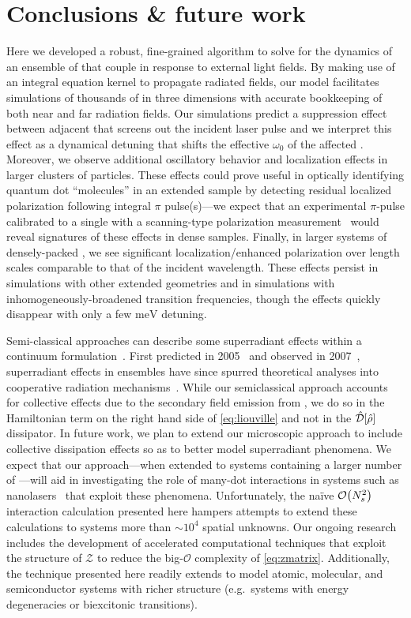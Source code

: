 \section{\label{section:conclusion}Conclusions \& future work}
Here we developed a robust, fine-grained algorithm to solve for the dynamics of an ensemble of \qds{} that couple in response to external light fields.
By making use of an integral equation kernel to propagate radiated fields, our model facilitates simulations of thousands of \qds{} in three dimensions with accurate bookkeeping of both near and far radiation fields.
Our simulations predict a suppression effect between adjacent \qds{} that screens out the incident laser pulse and we interpret this effect as a dynamical detuning that shifts the effective $\omega_0$ of the affected \qds{}.
Moreover, we observe additional oscillatory behavior and localization effects in larger clusters of particles.
These effects could prove useful in optically identifying quantum dot ``molecules'' in an extended sample by detecting residual localized polarization following integral $\pi$ pulse(s)---we expect that an experimental $\pi$-pulse calibrated to a single \qd{} with a scanning-type polarization measurement~\cite{Asakura2013} would reveal signatures of these effects in dense samples.
Finally, in larger systems of densely-packed \qds{}, we see significant localization/enhanced polarization over length scales comparable to that of the incident wavelength.
These effects persist in simulations with other extended geometries and in simulations with inhomogeneously-broadened transition frequencies, though the effects quickly disappear with only a few $\si{\milli\eV}$ detuning.

Semi-classical approaches can describe some superradiant effects within a continuum formulation~\cite{Gross1982,PhysRevA.4.302,PhysRevA.4.854}.
First predicted in 2005~\cite{Temnov2005} and observed in 2007~\cite{Scheibner2007}, superradiant effects in \qd{} ensembles have since spurred theoretical analyses into cooperative radiation mechanisms~\cite{Temnov2009,Chen2008}.
While our semiclassical approach accounts for collective effects due to the secondary field emission from \qds{}, we do so in the Hamiltonian term on the right hand side of \cref{eq:liouville} and not in the $\hat{\mathcal{D}}\qty[\hat{\rho}]$ dissipator.
In future work, we plan to extend our microscopic approach to include collective dissipation effects so as to better model superradiant phenomena.
We expect that our approach---when extended to systems containing a larger number of \qds{}---will aid in investigating the role of many-dot interactions in systems such as nanolasers~\cite{jahnke2016giant} that exploit these phenomena.
Unfortunately, the na\"ive $\mathcal{O}\qty(N_s^2)$ interaction calculation presented here hampers attempts to extend these calculations to systems more than $\sim 10^4$ spatial unknowns.
Our ongoing research includes the development of accelerated computational techniques that exploit the structure of $\mathcal{Z}$ to reduce the big-$\mathcal{O}$ complexity of \cref{eq:zmatrix}.
Additionally, the technique presented here readily extends to model atomic, molecular, and semiconductor systems with richer structure (e.g.\ systems with energy degeneracies or biexcitonic transitions).


